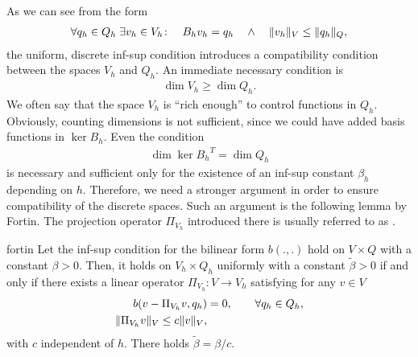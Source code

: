 \begin{intro}
  As we can see from the form
  \begin{gather*}
    \forall q_h\in Q_h \;
    \exists v_h\in V_h\colon
    \quad B_h v_h = q_h
    \quad\wedge\quad
    \lVert v_h\rVert_V \le \lVert q_h\rVert_Q,
  \end{gather*}
  the uniform, discrete inf-sup condition introduces a compatibility
  condition between the spaces $V_h$ and $Q_h$. An immediate necessary
  condition is
  \begin{gather}
    \dim V_h \ge \dim Q_h.
  \end{gather}
  We often say that the space $V_h$ is ``rich enough'' to control
  functions in $Q_h$. Obviously, counting dimensions is not
  sufficient, since we could have added basis functions in
  $\ker{B_h}$. Even the condition
  \begin{gather*}
    \dim\ker{B_h}^T = \dim Q_h
  \end{gather*}
  is necessary and sufficient only for the existence of an inf-sup
  constant $\beta_h$ depending on $h$. Therefore, we need a stronger
  argument in order to ensure compatibility of the discrete
  spaces. Such an argument is the following lemma by Fortin. The
  projection operator $\Pi_{V_h}$ introduced there is usually referred
  to as .
\end{intro}

\begin{Lemma}{fortin}
  Let the inf-sup condition for the bilinear form $b(.,.)$
  hold on $V\times Q$ with a constant
  $\beta>0$. Then, it holds on $V_h\times Q_h$ uniformly with a
  constant $\tilde\beta>0$ if and only if there exists a linear
  operator $\Pi_{V_h}\colon V\to V_h$ satisfying for any $v\in V$
  \begin{align}
    \label{eq:galerkin:15}
    b(v-\Pi_{V_h}v,q_h) &= 0,\qquad\forall q_h\in Q_h, \\
    \lVert\Pi_{V_h}v\rVert_V \le c \lVert v\rVert_V,
  \end{align}
  with $c$ independent of $h$. There holds $\tilde\beta = \beta/c$.
\end{Lemma}

